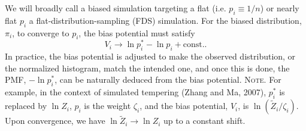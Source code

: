 \documentclass[reprint, superscriptaddress, floatfix]{revtex4-1}
\newcommand{\note}[1]{{\color{DarkGreen}\footnotesize \textsc{Note.} #1}}
\begin{document}
We will broadly call a biased simulation
targeting a flat (i.e. $p_i \equiv 1/n$)
or nearly flat\cite{
dayal2004, *trebst2004, *zhang2007, barducci2008, singh2011}
$p_i$
a flat-distribution-sampling (FDS) simulation.
%
For the biased distribution, $\pi_i$,
to converge to $p_i$,
the bias potential must satisfy
%
\begin{equation}
  V_i \to \ln p^*_i - \ln p_i + \mathrm{const.}
  .
  \label{eq:Vi_target}
\end{equation}
%
%
In practice,
the bias potential is adjusted to make the
observed distribution, or the normalized histogram,
match the intended one,
and once this is done,
the PMF, $-\ln p^*_i$, can be naturally
deduced from the bias potential. %
%
\note{
  For example, in the context of simulated tempering (Zhang and Ma, 2007),
  $p^*_i$ is replaced by $\ln Z_i$,
  $p_i$ is the weight $\zeta_i$,
  and the bias potential, $V_i$, is $\ln (\tilde Z_i / \zeta_i)$.
  Upon convergence, we have $\ln \tilde Z_i \to \ln Z_i$
  up to a constant shift.
}
\end{document}
